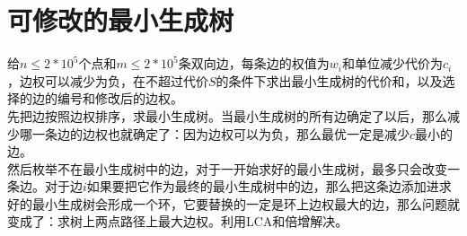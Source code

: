 



\section{可修改的最小生成树}
给$n\leq 2*10^5$个点和$m\leq 2 * 10^5$条双向边，每条边的权值为$w_i$和单位减少代价为$c_i$，边权可以减少为负，在不超过代价$S$的条件下求出最小生成树的代价和，以及选择的边的编号和修改后的边权。 \\

先把边按照边权排序，求最小生成树。当最小生成树的所有边确定了以后，那么减少哪一条边的边权也就确定了：因为边权可以为负，那么最优一定是减少$c$最小的边。\\

然后枚举不在最小生成树中的边，对于一开始求好的最小生成树，最多只会改变一条边。对于边$i$如果要把它作为最终的最小生成树中的边，那么把这条边添加进求好的最小生成树会形成一个环，它要替换的一定是环上边权最大的边，那么问题就变成了：求树上两点路径上最大边权。利用LCA和倍增解决。\\

